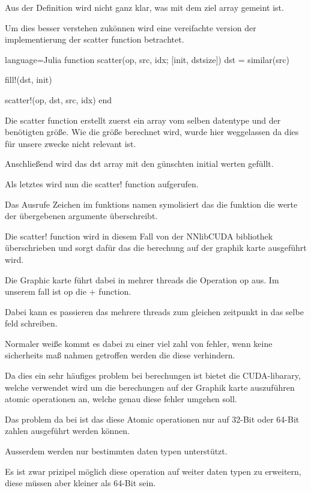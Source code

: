 Aus der Definition wird nicht ganz klar, was mit dem ziel array gemeint ist.

Um dies besser verstehen zukönnen wird eine vereifachte version der implementierung der scatter function betrachtet.

\begin{listing}{language=Julia}
	function scatter(op, src, idx; [init, dstsize])
		dst = similar(src)
		
		fill!(dst, init)
		
		scatter!(op, dst, src, idx)
	end
\end{listing}

Die scatter function erstellt zuerst ein array vom selben datentype und der benötigten größe. 
Wie die größe berechnet wird, wurde hier weggelassen da dies für unsere zwecke nicht relevant ist. 

Anschließend wird das dst array mit den günschten initial werten gefüllt.

Als letztes wird nun die scatter! function aufgerufen.

Das Ausrufe Zeichen im funktions namen symolisiert das die funktion die werte der übergebenen argumente überschreibt.

Die scatter! function wird in diesem Fall von der NNlibCUDA bibliothek überschrieben und sorgt dafür das die berechung auf der graphik karte ausgeführt wird.

Die Graphic karte führt dabei in mehrer threads die Operation op aus. Im unserem fall ist op die + function.

Dabei kann es passieren das mehrere threads zum gleichen zeitpunkt in das selbe feld schreiben.

Normaler weiße kommt es dabei zu einer viel zahl von fehler, wenn keine sicherheits maß nahmen getroffen werden die diese verhindern.

Da dies ein sehr häufiges problem bei berechungen ist bietet die CUDA-libarary, 
welche verwendet wird um die berechungen auf der Graphik karte auszuführen atomic operationen an, 
welche genau diese fehler umgehen soll.


Das problem da bei ist das diese Atomic operationen nur auf 32-Bit oder 64-Bit zahlen ausgeführt werden können.

Ausserdem werden nur bestimmten daten typen unterstützt.

Es ist zwar prizipel möglich diese operation auf weiter daten typen zu erweitern, diese müssen aber kleiner als 64-Bit sein. 

